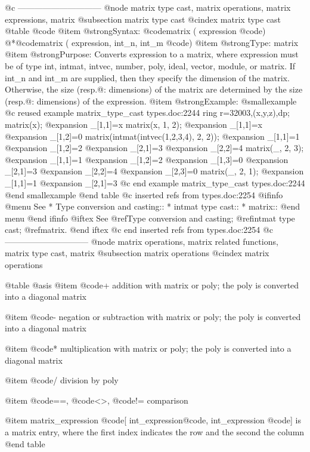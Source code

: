 {{{{{{@c ------------------------------
@node matrix type cast,  matrix operations, matrix expressions, matrix
@subsection matrix type cast
@cindex matrix type cast
@table @code
@item @strong{Syntax:}
@code{matrix (} expression @code{)}
@*@code{matrix (} expression, int_n, int_m  @code{)}
@item @strong{Type:}
matrix
@item @strong{Purpose:}
Converts expression to a matrix, where expression must be of type int,
intmat, intvec, number, poly, ideal, vector, module, or matrix. If
int_n and int_m are supplied, then they specify the dimension of the
matrix. Otherwise, the size (resp.@: dimensions) of the matrix
are determined  by the size (resp.@: dimensions) of the
expression.
@item @strong{Example:}
@smallexample
@c reused example matrix_type_cast types.doc:2244 
  ring r=32003,(x,y,z),dp;
  matrix(x);
@expansion{} _[1,1]=x
  matrix(x, 1, 2);
@expansion{} _[1,1]=x
@expansion{} _[1,2]=0
  matrix(intmat(intvec(1,2,3,4), 2, 2));
@expansion{} _[1,1]=1
@expansion{} _[1,2]=2
@expansion{} _[2,1]=3
@expansion{} _[2,2]=4
  matrix(_, 2, 3);
@expansion{} _[1,1]=1
@expansion{} _[1,2]=2
@expansion{} _[1,3]=0
@expansion{} _[2,1]=3
@expansion{} _[2,2]=4
@expansion{} _[2,3]=0
  matrix(_, 2, 1);
@expansion{} _[1,1]=1
@expansion{} _[2,1]=3
@c end example matrix_type_cast types.doc:2244
@end smallexample
@end table
@c inserted refs from types.doc:2254
@ifinfo
@menu
See
* Type conversion and casting::
* intmat type cast::
* matrix::
@end menu
@end ifinfo
@iftex
See
@ref{Type conversion and casting};
@ref{intmat type cast};
@ref{matrix}.
@end iftex
@c end inserted refs from types.doc:2254
@c ------------------------------
@node matrix operations, matrix related functions, matrix type cast, matrix
@subsection matrix operations
@cindex matrix operations

@table @asis
@item @code{+}
addition with matrix or poly; the poly is converted into a diagonal
matrix

@item @code{-}
negation or subtraction with matrix or poly; the poly is converted into
a diagonal matrix

@item @code{*}
multiplication with matrix or poly; the poly is converted into a
diagonal matrix

@item @code{/}
division by poly

@item @code{==}, @code{<>}, @code{!=}
comparison

@item matrix_expression @code{[} int_expression@code{,} int_expression @code{]}
is a matrix entry, where the first index indicates the row and the
second the column
@end table

}}}}}}
